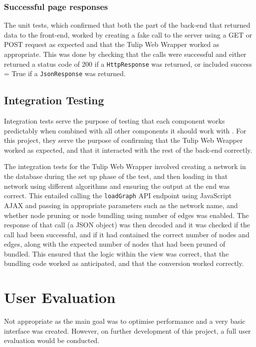\documentclass[../dissertation.tex]{subfiles}
\begin{document}
\subsubsection{Successful page responses}

The unit tests, which confirmed that both the part of the back-end that returned data to the front-end, worked by creating a fake call to the server using a GET or POST request as expected and that the Tulip Web Wrapper worked as appropriate. This was done by checking that the calls were successful and either returned a status code of 200 if a \texttt{HttpResponse} was returned, or included success = True if a \texttt{JsonResponse} was returned.

\subsection{Integration Testing}

Integration tests serve the purpose of testing that each component works predictably when combined with all other components it should work with \cite{basanieri2000practical}. For this project, they serve the purpose of confirming that the Tulip Web Wrapper worked as expected, and that it interacted with the rest of the back-end correctly.

The integration tests for the Tulip Web Wrapper involved creating a network in the database during the set up phase of the test, and then loading in that network using different algorithms and ensuring the output at the end was correct. This entailed calling the \texttt{loadGraph} API endpoint using JavaScript AJAX \cite{jquery-ajax} and passing in appropriate parameters such as the network name, and whether node pruning or node bundling using number of edges was enabled. The response of that call (a JSON object) was then decoded and it was checked if the call had been successful, and if it had contained the correct number of nodes and edges, along with the expected number of nodes that had been pruned of bundled. This ensured that the logic within the view was correct, that the bundling code worked as anticipated, and that the conversion worked correctly.

\section{User Evaluation}

Not appropriate as the main goal was to optimise performance and a very basic interface was created. However, on further development of this project, a full user evaluation would be conducted.
\end{document}

